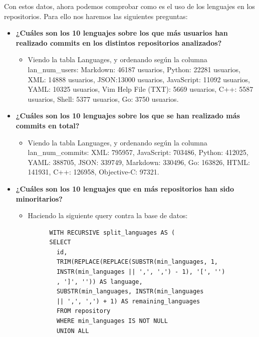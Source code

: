 \documentclass[a4paper, 12pt]{book}
\begin{document}
Con estos datos, ahora podemos comprobar como es el uso de los lenguajes en los repositorios. Para ello nos haremos las siguientes preguntas:

\begin{itemize}
  \item \textbf{¿Cuáles son los 10 lenguajes sobre los que más usuarios han realizado commits en los distintos repositorios analizados?}
        \begin{itemize}
          \item Viendo la tabla Languages, y ordenando según la columna lan\_num\_users: Markdown: 46187 usuarios, Python: 22281 usuarios, XML: 14888 usuarios, JSON:13000 usuarios, JavaScript: 11092 usuarios, YAML: 10325 usuarios, Vim Help File (TXT): 5669 usuarios, C++: 5587 usuarios, Shell: 5377 usuarios, Go: 3750 usuarios.
        \end{itemize}
  \item \textbf{¿Cuáles son los 10 lenguajes sobre los que se han realizado más commits en total?}
        \begin{itemize}
          \item Viendo la tabla Languages, y ordenando según la columna lan\_num\_commits: XML: 795957, JavaScript: 703486, Python: 412025, YAML: 388705, JSON: 339749, Markdown: 330496, Go: 163826, HTML: 141931, C++: 126958, Objective-C: 97321.
        \end{itemize}
  \item \textbf{¿Cuáles son los 10 lenguajes que en más repositorios han sido minoritarios?}
        \begin{itemize}
          \item Haciendo la siguiente query contra la base de datos:
                \begin{verbatim}
      WITH RECURSIVE split_languages AS (
      SELECT 
        id,
        TRIM(REPLACE(REPLACE(SUBSTR(min_languages, 1, 
        INSTR(min_languages || ',', ',') - 1), '[', '')
        , ']', '')) AS language,
        SUBSTR(min_languages, INSTR(min_languages 
        || ',', ',') + 1) AS remaining_languages
        FROM repository
        WHERE min_languages IS NOT NULL
        UNION ALL


\end{verbatim}
\end{itemize}
\end{itemize}
\end{document}

